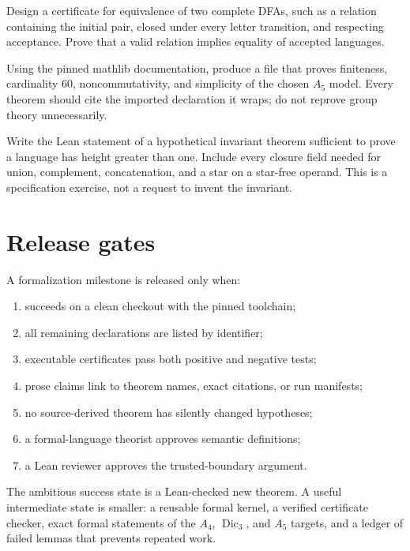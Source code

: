 \documentclass{amsart}
\begin{document}
\begin{exercise}
Design a certificate for equivalence of two complete DFAs, such as a relation containing the initial pair, closed under every letter transition, and respecting acceptance.  Prove that a valid relation implies equality of accepted languages.
\end{exercise}

\begin{exercise}
Using the pinned mathlib documentation, produce a file that proves finiteness, cardinality $60$, noncommutativity, and simplicity of the chosen $A_5$ model.  Every theorem should cite the imported declaration it wraps; do not reprove group theory unnecessarily.
\end{exercise}

\begin{exercise}
Write the Lean statement of a hypothetical invariant theorem sufficient to prove a language has height greater than one.  Include every closure field needed for union, complement, concatenation, and a star on a star-free operand.  This is a specification exercise, not a request to invent the invariant.
\end{exercise}

\section{Release gates}

A formalization milestone is released only when:
\begin{enumerate}
  \item {} succeeds on a clean checkout with the pinned toolchain;
  \item all remaining  declarations are listed by identifier;
  \item executable certificates pass both positive and negative tests;
  \item prose claims link to theorem names, exact citations, or run manifests;
  \item no source-derived theorem has silently changed hypotheses;
  \item a formal-language theorist approves semantic definitions;
  \item a Lean reviewer approves the trusted-boundary argument.
\end{enumerate}

The ambitious success state is a Lean-checked new theorem.  A useful intermediate state is smaller: a reusable formal kernel, a verified certificate checker, exact formal statements of the $A_4$, $\operatorname{Dic}_3$, and $A_5$ targets, and a ledger of failed lemmas that prevents repeated work.
\end{document}
